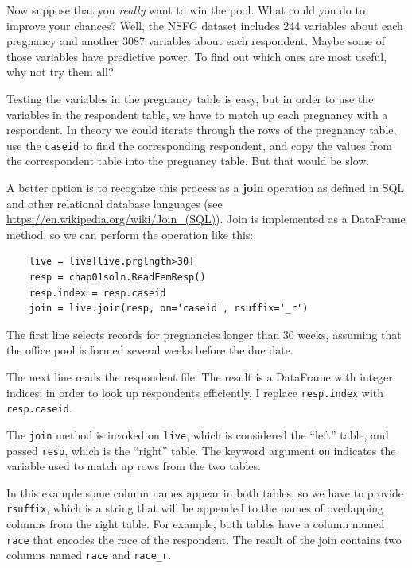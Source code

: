 \documentclass[12pt]{book}
\theoremstyle{exercise}
\begin{document}
Now suppose that you {\em really\/} want to win the pool.  What could
you do to improve your chances?  Well, 
the NSFG dataset includes 244 variables about each pregnancy and another
3087 variables about each respondent.  Maybe some of those variables
have predictive power.  To find out which ones are most useful,
why not try them all?%

Testing the variables in the pregnancy table is easy, but in order to
use the variables in the respondent table, we have to match up each
pregnancy with a respondent.  In theory we could iterate through the
rows of the pregnancy table, use the {\tt caseid} to find the
corresponding respondent, and copy the values from the
correspondent table into the pregnancy table.  But that would be slow.%
%

A better option is to recognize this process as a {\bf join} operation
as defined in SQL and other relational database languages (see
\url{https://en.wikipedia.org/wiki/Join_(SQL)}).  Join is implemented
as a DataFrame method, so we can perform the operation like this:%

\begin{verbatim}
    live = live[live.prglngth>30]
    resp = chap01soln.ReadFemResp()
    resp.index = resp.caseid
    join = live.join(resp, on='caseid', rsuffix='_r')
\end{verbatim}

The first line selects records for pregnancies longer than 30 weeks,
assuming that the office pool is formed several weeks before the
due date.%

The next line reads the respondent file.  The result is a DataFrame
with integer indices; in order to look up respondents efficiently,
I replace {\tt resp.index} with {\tt resp.caseid}. 

The {\tt join} method is invoked on {\tt live}, which is considered
the ``left'' table, and passed {\tt resp}, which is the ``right'' table.
The keyword argument {\tt on} indicates the variable used to match up
rows from the two tables.

In this example some column names appear in both tables,
so we have to provide {\tt rsuffix}, which is a string that will be
appended to the names of overlapping columns from the right table.
For example, both tables have a column named {\tt race} that encodes
the race of the respondent.  The result of the join contains two
columns named {\tt race} and \verb"race_r".%
\end{document}
